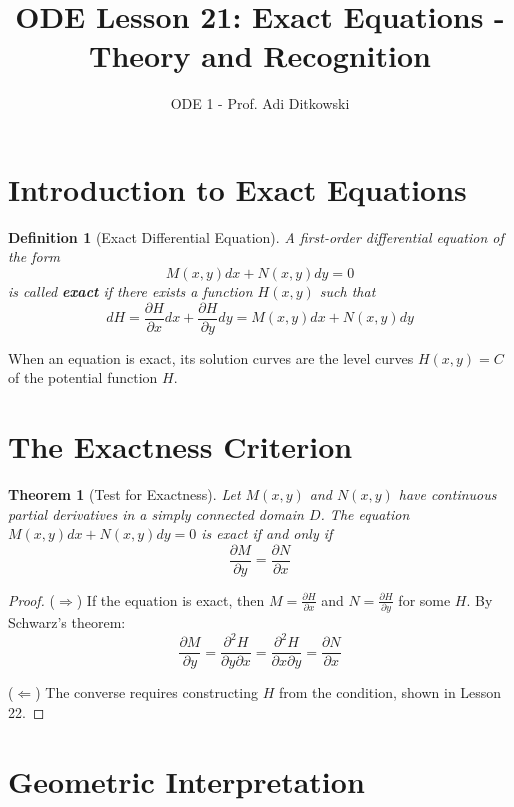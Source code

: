 \documentclass[12pt]{article}
\title{ODE Lesson 21: Exact Equations - Theory and Recognition}
\author{ODE 1 - Prof. Adi Ditkowski}
\date{}
\newtheorem{definition}{Definition}
\newtheorem{theorem}{Theorem}
\begin{document}
\maketitle

\section{Introduction to Exact Equations}

\begin{definition}[Exact Differential Equation]
A first-order differential equation of the form
\[M(x,y)dx + N(x,y)dy = 0\]
is called \textbf{exact} if there exists a function $H(x,y)$ such that
\[dH = \frac{\partial H}{\partial x}dx + \frac{\partial H}{\partial y}dy = M(x,y)dx + N(x,y)dy\]
\end{definition}

\begin{keypoint}
When an equation is exact, its solution curves are the level curves $H(x,y) = C$ of the potential function $H$.
\end{keypoint}

\section{The Exactness Criterion}

\begin{theorem}[Test for Exactness]
Let $M(x,y)$ and $N(x,y)$ have continuous partial derivatives in a simply connected domain $D$. The equation $M(x,y)dx + N(x,y)dy = 0$ is exact if and only if
\[\boxed{\frac{\partial M}{\partial y} = \frac{\partial N}{\partial x}}\]
\end{theorem}

\begin{proof}
($\Rightarrow$) If the equation is exact, then $M = \frac{\partial H}{\partial x}$ and $N = \frac{\partial H}{\partial y}$ for some $H$. By Schwarz's theorem:
\[\frac{\partial M}{\partial y} = \frac{\partial^2 H}{\partial y \partial x} = \frac{\partial^2 H}{\partial x \partial y} = \frac{\partial N}{\partial x}\]

($\Leftarrow$) The converse requires constructing $H$ from the condition, shown in Lesson 22.
\end{proof}

\section{Geometric Interpretation}
\end{document}
